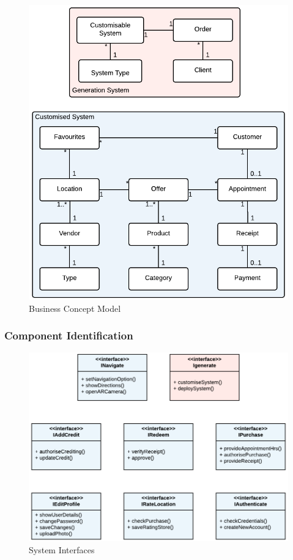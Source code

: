\begin{figure}[!ht]
\centering
\includegraphics[scale=0.4]{img/Business_Concept_Model.png}
\caption{Business Concept Model}
\label{fig:business_concept_model}
\end{figure}

\subsubsection{Component Identification}

\begin{figure}[!ht]
\centering
\includegraphics[scale=0.3]{img/System_Interfaces.png}
\caption{System Interfaces}
\label{fig:system_interfaces}
\end{figure}